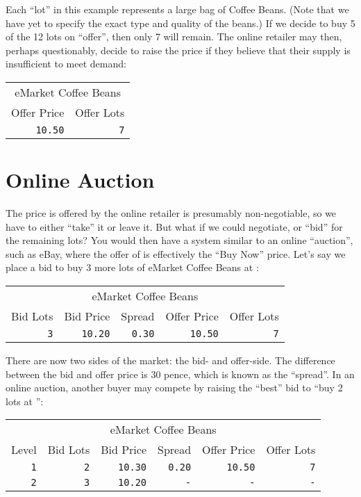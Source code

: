 \documentclass[12pt,a4paper,notitlepage,bibliography=totoc]{scrreprt}
\newcommand{\s}{\textsterling}
\begin{document}
Each ``\gls{lot}'' in this example represents a large bag of Coffee Beans. (Note that we have yet to
specify the exact type and quality of the beans.) If we decide to buy 5 of the 12 \glspl{lot} on
``\gls{offer}'', then only 7 will remain. The online retailer may then, perhaps questionably, decide
to raise the price if they believe that their supply is insufficient to meet demand:

\vspace{5mm}
\begin{tabular}{rr}
\multicolumn{2}{c}{eMarket Coffee Beans}\\
Offer Price&Offer Lots\\
\hline
\texttt{10.50}&\texttt{7}\\
\end{tabular}
\vspace{5mm}

\section{Online Auction}

The price is offered by the online retailer is presumably non-negotiable, so we have to either
``take'' it or leave it. But what if we could negotiate, or ``\gls{bid}'' for the remaining
\glspl{lot}? You would then have a system similar to an online ``\gls{auction}'', such as
eBay\cite{ebay}, where the \gls{offer} of \s10.50 is effectively the ``Buy Now'' price. Let's say we
place a \gls{bid} to buy 3 more \glspl{lot} of eMarket Coffee Beans at \s10.20:

\vspace{5mm}
\begin{tabular}{rrrrr}
\multicolumn{5}{c}{eMarket Coffee Beans}\\
Bid Lots&Bid Price&Spread&Offer Price&Offer Lots\\
\hline
\texttt{3}&\texttt{10.20}&\texttt{0.30}&\texttt{10.50}&\texttt{7}\\
\end{tabular}
\vspace{5mm}

There are now two sides of the \gls{market}: the \gls{bid}- and \gls{offer}-side. The difference
between the \gls{bid} and \gls{offer} price is 30 pence, which is known as the ``\gls{spread}''. In
an online \gls{auction}, another buyer may compete by raising the ``best'' \gls{bid} to ``buy 2
\glspl{lot} at \s10.30'':

\vspace{5mm}
\begin{tabular}{r|rrrrr}
\multicolumn{6}{c}{eMarket Coffee Beans}\\
Level&Bid Lots&Bid Price&Spread&Offer Price&Offer Lots\\
\hline
\texttt{1}&\texttt{2}&\texttt{10.30}&\texttt{0.20}&\texttt{10.50}&\texttt{7}\\
\texttt{2}&\texttt{3}&\texttt{10.20}&\texttt{-}&\texttt{-}&\texttt{-}\\
\end{tabular}
\vspace{5mm}
\end{document}
